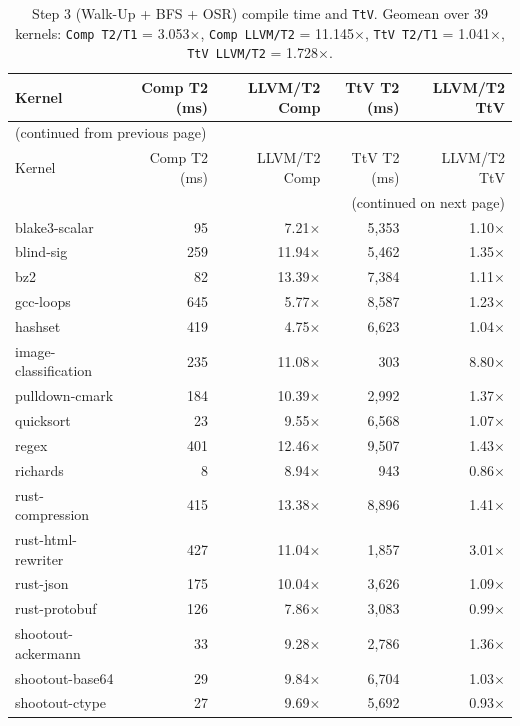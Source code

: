 \begin{longtable}{l r r r r}
\caption{Step 3 (Walk-Up + BFS + OSR) compile time and \texttt{TtV}. Geomean over 39 kernels: \texttt{Comp T2/T1} = 3.053$\times$, \texttt{Comp LLVM/T2} = 11.145$\times$, \texttt{TtV T2/T1} = 1.041$\times$, \texttt{TtV LLVM/T2} = 1.728$\times$.}
\label{tbl:appB:step3:ct}\\
\toprule
Kernel & Comp T2 (ms) & LLVM/T2 Comp & TtV T2 (ms) & LLVM/T2 TtV \\
\midrule
\endfirsthead
\multicolumn{5}{l}{\small (continued from previous page)} \\
\toprule
Kernel & Comp T2 (ms) & LLVM/T2 Comp & TtV T2 (ms) & LLVM/T2 TtV \\
\midrule
\endhead
\midrule
\multicolumn{5}{r}{\small (continued on next page)} \\
\endfoot
\bottomrule
\endlastfoot
blake3-scalar & 95 & 7.21$\times$ & 5{,}353 & 1.10$\times$ \\
blind-sig & 259 & 11.94$\times$ & 5{,}462 & 1.35$\times$ \\
bz2 & 82 & 13.39$\times$ & 7{,}384 & 1.11$\times$ \\
gcc-loops & 645 & 5.77$\times$ & 8{,}587 & 1.23$\times$ \\
hashset & 419 & 4.75$\times$ & 6{,}623 & 1.04$\times$ \\
image-classification & 235 & 11.08$\times$ & 303 & 8.80$\times$ \\
pulldown-cmark & 184 & 10.39$\times$ & 2{,}992 & 1.37$\times$ \\
quicksort & 23 & 9.55$\times$ & 6{,}568 & 1.07$\times$ \\
regex & 401 & 12.46$\times$ & 9{,}507 & 1.43$\times$ \\
richards & 8 & 8.94$\times$ & 943 & 0.86$\times$ \\
rust-compression & 415 & 13.38$\times$ & 8{,}896 & 1.41$\times$ \\
rust-html-rewriter & 427 & 11.04$\times$ & 1{,}857 & 3.01$\times$ \\
rust-json & 175 & 10.04$\times$ & 3{,}626 & 1.09$\times$ \\
rust-protobuf & 126 & 7.86$\times$ & 3{,}083 & 0.99$\times$ \\
shootout-ackermann & 33 & 9.28$\times$ & 2{,}786 & 1.36$\times$ \\
shootout-base64 & 29 & 9.84$\times$ & 6{,}704 & 1.03$\times$ \\
shootout-ctype & 27 & 9.69$\times$ & 5{,}692 & 0.93$\times$ \\

\end{longtable}
